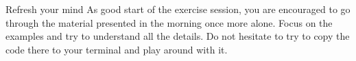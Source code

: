 
\begin{exercise}[DarkGreen]{Refresh your mind}
    As good start of the exercise session, you are encouraged to go through the material presented in the morning once more alone.
    Focus on the examples and try to understand all the details.
    Do not hesitate to try to copy the code there to your terminal and play around with it.
\end{exercise}
